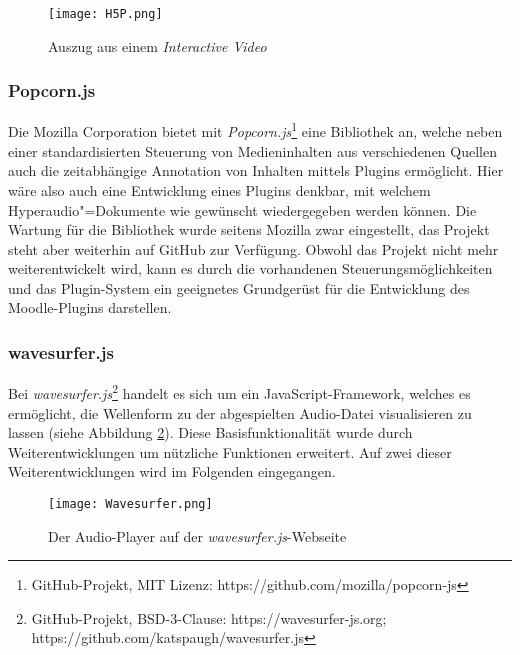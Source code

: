 \begin{figure}[h!]
\texttt{[image: H5P.png]}
\caption{\label{fig:H5P} Auszug aus einem \textit{Interactive Video} \citep{h5p2013video}}
\end{figure}

\subsubsection{Popcorn.js}
Die Mozilla Corporation bietet mit \textit{Popcorn.js}\footnote{GitHub-Projekt, MIT Lizenz: https://github.com/mozilla/popcorn-js} eine Bibliothek an, welche neben einer standardisierten Steuerung von Medieninhalten aus verschiedenen Quellen auch die zeitabhängige Annotation von Inhalten mittels Plugins ermöglicht. Hier wäre also auch eine Entwicklung eines Plugins denkbar, mit welchem Hyperaudio"=Dokumente wie gewünscht wiedergegeben werden können. Die Wartung für die Bibliothek wurde seitens Mozilla zwar eingestellt, das Projekt steht aber weiterhin auf GitHub zur Verfügung. Obwohl das Projekt nicht mehr weiterentwickelt wird, kann es durch die vorhandenen Steuerungsmöglichkeiten und das Plugin-System ein geeignetes Grundgerüst für die Entwicklung des Moodle-Plugins darstellen.

 
\subsubsection{wavesurfer.js}
\label{sec:wavesurfer.js}
Bei \textit{wavesurfer.js}\footnote{GitHub-Projekt, BSD-3-Clause: https://wavesurfer-js.org; https://github.com/katspaugh/wavesurfer.js} handelt es sich um ein JavaScript-Framework, welches es ermöglicht, die Wellenform zu der abgespielten Audio-Datei visualisieren zu lassen (siehe Abbildung \ref{fig:Wavesurfer}). Diese Basisfunktionalität wurde durch Weiterentwicklungen um nützliche Funktionen erweitert. Auf zwei dieser Weiterentwicklungen wird im Folgenden eingegangen.

\begin{figure}[h!]
\texttt{[image: Wavesurfer.png]}
\caption{\label{fig:Wavesurfer} Der Audio-Player auf der \textit{wavesurfer.js}-Webseite\citep{wavesurfer}}
\end{figure}


